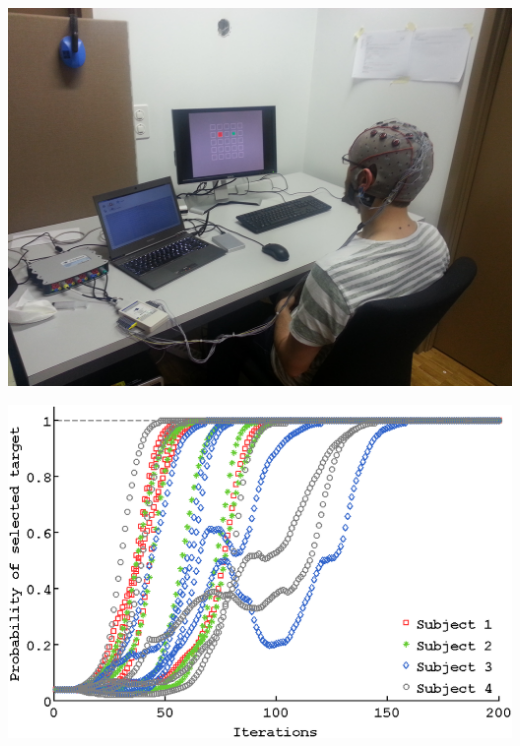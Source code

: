 \documentclass[a0,final, portrait]{inriaposter}
\begin{document}
\begin{multicols}{2}
{\begin{center}
\begin{minipage}{.46\columnwidth}
\begin{center}
\includegraphics[width=\columnwidth, trim=2cm 10cm 10cm 15cm, clip=true]{images/BCI_setup2.jpg}
\end{center}
\end{minipage}
\begin{minipage}{.02\columnwidth}
	\begin{center}

	\end{center}
\end{minipage}
\begin{minipage}{.46\columnwidth}
\begin{center}
\includegraphics[width=\columnwidth]{images/plot_realevolution}	
\end{center}
\end{minipage}
\end{center}

}
\end{multicols}
\end{document}
